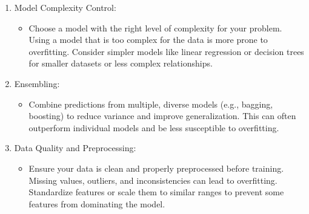\begin{enumerate}
        \item Model Complexity Control:
            \begin{itemize}
                \item Choose a model with the right level of complexity for your problem. Using a model that is too complex for the data is more prone to overfitting. Consider simpler models like linear regression or decision trees for smaller datasets or less complex relationships.
            \end{itemize}
        
        \item Ensembling:
            \begin{itemize}
                \item Combine predictions from multiple, diverse models (e.g., bagging, boosting) to reduce variance and improve generalization. This can often outperform individual models and be less susceptible to overfitting.
            \end{itemize}
        
        \item Data Quality and Preprocessing:
            \begin{itemize}
                \item Ensure your data is clean and properly preprocessed before training. Missing values, outliers, and inconsistencies can lead to overfitting. Standardize features or scale them to similar ranges to prevent some features from dominating the model.
            \end{itemize}
    \end{enumerate}

